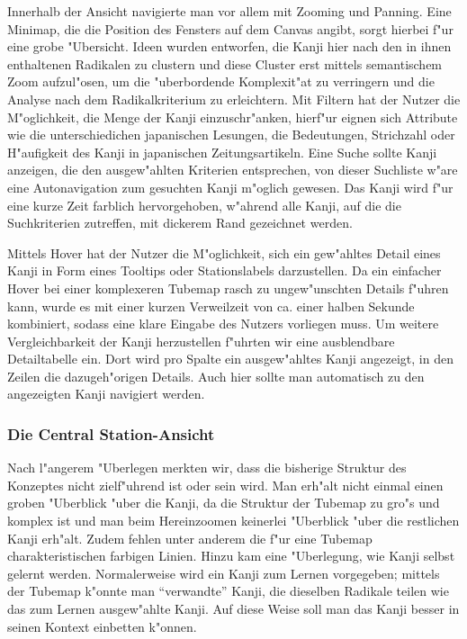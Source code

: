 Innerhalb der Ansicht navigierte man vor allem mit Zooming und Panning. Eine Minimap, die die Position des Fensters auf dem Canvas angibt, sorgt hierbei f"ur eine grobe "Ubersicht. Ideen wurden entworfen, die Kanji hier nach den in ihnen enthaltenen Radikalen zu clustern und diese Cluster erst mittels semantischem Zoom aufzul"osen, um die "uberbordende Komplexit"at zu verringern und die Analyse nach dem Radikalkriterium zu erleichtern. Mit Filtern hat der Nutzer die M"oglichkeit, die Menge der Kanji einzuschr"anken, hierf"ur eignen sich Attribute wie die unterschiedichen japanischen Lesungen, die Bedeutungen, Strichzahl oder H"aufigkeit des Kanji in japanischen Zeitungsartikeln. Eine Suche sollte Kanji anzeigen, die den ausgew"ahlten Kriterien entsprechen, von dieser Suchliste w"are eine Autonavigation zum gesuchten Kanji m"oglich gewesen. Das Kanji wird f"ur eine kurze Zeit farblich hervorgehoben, w"ahrend alle Kanji, auf die die Suchkriterien zutreffen, mit dickerem Rand gezeichnet werden.

Mittels Hover hat der Nutzer die M"oglichkeit, sich ein gew"ahltes Detail eines Kanji in Form eines Tooltips oder Stationslabels darzustellen. Da ein einfacher Hover bei einer komplexeren Tubemap rasch zu ungew"unschten Details f"uhren kann, wurde es mit einer kurzen Verweilzeit von ca. einer halben Sekunde kombiniert, sodass eine klare Eingabe des Nutzers vorliegen muss. Um weitere Vergleichbarkeit der Kanji herzustellen f"uhrten wir eine ausblendbare Detailtabelle ein. Dort wird pro Spalte ein ausgew"ahltes Kanji angezeigt, in den Zeilen die dazugeh"origen Details. Auch hier sollte man automatisch zu den angezeigten Kanji navigiert werden. 


\subsubsection{Die Central Station-Ansicht}
Nach l"angerem "Uberlegen merkten wir, dass die bisherige Struktur des Konzeptes nicht zielf"uhrend ist oder sein wird. Man erh"alt nicht einmal einen groben "Uberblick "uber die Kanji, da die Struktur der Tubemap zu gro"s und komplex ist und man beim Hereinzoomen keinerlei "Uberblick "uber die restlichen Kanji erh"alt. Zudem fehlen unter anderem die f"ur eine Tubemap charakteristischen farbigen Linien. Hinzu kam eine "Uberlegung, wie Kanji selbst gelernt werden. Normalerweise wird ein Kanji zum Lernen vorgegeben; mittels der Tubemap k"onnte man "`verwandte"' Kanji, die dieselben Radikale teilen wie das zum Lernen ausgew"ahlte Kanji. Auf diese Weise soll man das Kanji besser in seinen Kontext einbetten k"onnen.


